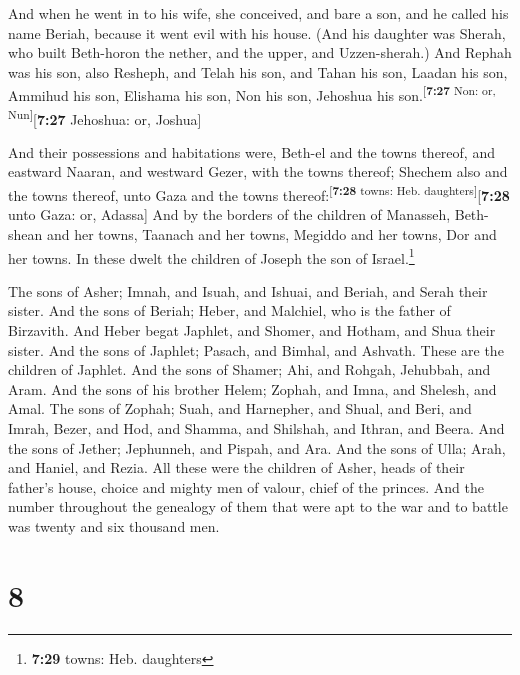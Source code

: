  And when he went in to his wife, she conceived, and bare
a son, and he called his name Beriah, because it went evil with his
house.  (And his daughter was Sherah, who built
Beth-horon the nether, and the upper, and Uzzen-sherah.) 
And Rephah was his son, also Resheph, and Telah his son, and Tahan his
son,  Laadan his son, Ammihud his son, Elishama his son,
 Non his son, Jehoshua his
son.\textsuperscript{{[}\textbf{7:27} Non: or, Nun{]}}{[}\textbf{7:27}
Jehoshua: or, Joshua{]}

 And their possessions and habitations were, Beth-el and
the towns thereof, and eastward Naaran, and westward Gezer, with the
towns thereof; Shechem also and the towns thereof, unto Gaza and the
towns thereof:\textsuperscript{{[}\textbf{7:28} towns: Heb.
daughters{]}}{[}\textbf{7:28} unto Gaza: or, Adassa{]} 
And by the borders of the children of Manasseh, Beth-shean and her
towns, Taanach and her towns, Megiddo and her towns, Dor and her towns.
In these dwelt the children of Joseph the son of Israel.\footnote{\textbf{7:29}
  towns: Heb. daughters}

 The sons of Asher; Imnah, and Isuah, and Ishuai, and
Beriah, and Serah their sister.  And the sons of Beriah;
Heber, and Malchiel, who is the father of Birzavith.  And
Heber begat Japhlet, and Shomer, and Hotham, and Shua their sister.
 And the sons of Japhlet; Pasach, and Bimhal, and
Ashvath. These are the children of Japhlet.  And the sons
of Shamer; Ahi, and Rohgah, Jehubbah, and Aram.  And the
sons of his brother Helem; Zophah, and Imna, and Shelesh, and Amal.
 The sons of Zophah; Suah, and Harnepher, and Shual, and
Beri, and Imrah,  Bezer, and Hod, and Shamma, and
Shilshah, and Ithran, and Beera.  And the sons of Jether;
Jephunneh, and Pispah, and Ara.  And the sons of Ulla;
Arah, and Haniel, and Rezia.  All these were the children
of Asher, heads of their father's house, choice and mighty men of
valour, chief of the princes. And the number throughout the genealogy of
them that were apt to the war and to battle was twenty and six thousand
men.

\hypertarget{section-7}{%
\section{8}\label{section-7}}

